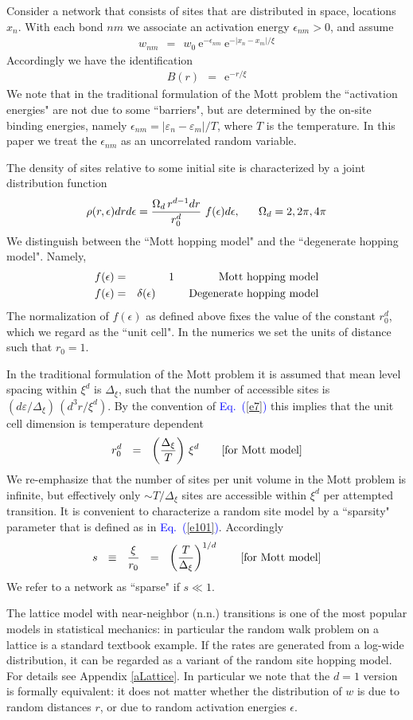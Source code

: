 \documentclass[aps,pre,floats,floatfix,twocolumn]{revtex4}
\newcommand{\eexp}{\mbox{e}^}
\newcommand{\mylabel}[1]{\label{#1}}
\newcommand{\beq}{\begin{eqnarray}}
\newcommand{\eeq}{\end{eqnarray}}
\newcommand{\be}[1]{\begin{eqnarray}\ifthenelse{#1=-1}
{\nonumber}{\ifthenelse{#1=0}{}{\mylabel{e#1}}}}
\newcommand{\Eq}[1]{\textcolor{blue}{Eq.\!\!~(\ref{#1})}}
\newcommand{\rmrk}[1]{#1}
\begin{document}
\rmrk{Consider a network that consists of sites 
that are distributed in space}, locations $x_n$.
With each bond $nm$ we associate an activation 
energy $\epsilon_{nm}>0$, and assume   
%
\beq
w_{nm} \ \ = \ \  w_0 \ \eexp{-\epsilon_{nm}} \ \eexp{-|x_n-x_m|/\xi} 
\eeq
%
Accordingly we have the identification 
%
\beq
B(r) \ \ = \ \ \eexp{-r/\xi} 
\eeq
%
We note that in the traditional formulation 
of the Mott problem the ``activation energies"
are not due to some ``barriers", 
but are determined by the on-site binding energies, 
namely $\epsilon_{nm}=|\varepsilon_n-\varepsilon_m|/T$,   
where $T$ is the temperature.
In this paper we treat the $\epsilon_{nm}$ 
as an uncorrelated random variable.

The density of sites relative to some initial site 
is characterized  by a joint distribution function 
%
\be{7}
\rho(r,\epsilon)drd\epsilon = \frac{\Omega_d \, r^{d-1}dr}{r_0^{d}} \ f(\epsilon)d\epsilon,     
\ \ \ \ \ \Omega_d=2,2\pi,4\pi
\eeq
%
We distinguish between the ``Mott hopping model" 
and the ``degenerate hopping model". Namely, 
%
\be{72}
f(\epsilon) &=& 1  \ \ \ \ \ \ \ \ \ \ \ \ \mbox{Mott hopping model}   \\        
\label{e71}
f(\epsilon) &=& \delta(\epsilon) \ \ \ \ \ \ \ \ \ \mbox{Degenerate hopping model}
\eeq
%
The normalization of $f(\epsilon)$ as defined above 
fixes the value of the constant $r_0^d$, which we regard 
as the ``unit cell". 
In the numerics we set the units of distance such that ${r_0=1}$.

In the traditional formulation of the Mott problem 
it is assumed that mean level spacing within $\xi^d$ 
is $\Delta_{\xi}$, such that the number of accessible sites 
is ${(d\varepsilon /\Delta_{\xi}) \, (d^3r/\xi^d)}$. 
\rmrk{By the convention} of \Eq{e7} this implies 
that the unit cell dimension is temperature dependent
%
\be{100}
r_0^d \ \ = \ \  \left(\frac{\Delta_{\xi}}{T}\right) \, \xi^d
\ \ \ \ \ \ \rmrk{\text{[for Mott model]}}
\eeq
%
We re-emphasize that the number of sites per unit volume
in the Mott problem is infinite, but effectively 
only $\sim T/\Delta_{\xi}$ sites are accessible 
within $\xi^d$ per attempted transition. 
%
It is convenient to characterize a random 
site model by a ``sparsity" parameter that 
is defined as in \Eq{e101}. Accordingly 
%
\be{1011}
s \ \ \equiv \ \ \frac{\xi}{r_0} \ \ = \ \ \left(\frac{T}{\Delta_{\xi}}\right)^{1/d} 
\ \ \ \ \ \ \rmrk{\text{[for Mott model]}}
\eeq
%
We refer to a network as ``sparse" if $s\ll1$.


\rmrk{The lattice model with near-neighbor (n.n.) transitions} 
is one of the most popular models in statistical mechanics: 
in particular the random walk problem on a lattice 
is a standard textbook example. If the rates are 
generated from a log-wide distribution, it can be regarded 
as a variant of the random site hopping model. 
For details see Appendix \ref{aLattice}. 
% 
In particular we note that the $d{=}1$ version is 
formally equivalent: it does not matter whether 
the distribution of $w$ is due to random distances $r$, 
or due to random activation energies $\epsilon$.  
\end{document}
